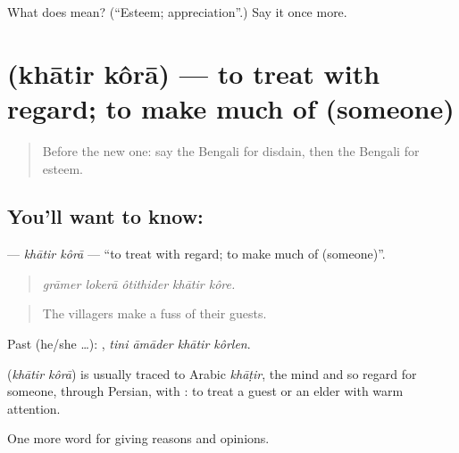 \begin{tcolorbox}[breakable,colback=teal!4,colframe=teal!35!black,title={Before you move on}]
What does  mean? (\textquotedblleft{}Esteem; appreciation\textquotedblright{}.) Say it once more.
\end{tcolorbox}
\section[\texorpdfstring{\bn{খাতির} \bn{করা} (khātir kôrā)}{খাতির করা (khātir kôrā)}]{  (khātir kôrā) — to treat with regard; to make much of (someone)}

\label{lesson:BN-C351-khatir-kora}



\begin{quote}
Before the new one: say the Bengali for disdain, then the Bengali for esteem.
\end{quote}

\subsection*{You'll want to know:  }
\textbf{ } — \emph{khātir kôrā} — \textquotedblleft{}to treat with regard; to make much of (someone)\textquotedblright{}.

\begin{quote}
    
\end{quote}

\begin{quote}
\emph{grāmer lokerā ôtithider khātir kôre.}
\end{quote}

\begin{quote}
The villagers make a fuss of their guests.
\end{quote}

Past (he/she …):    , \emph{tini āmāder khātir kôrlen}.

\begin{cousinweb}
\textbf{ } (\emph{khātir kôrā}) is usually traced to Arabic \emph{khāṭir}, the mind and so regard for someone, through Persian, with : to treat a guest or an elder with warm attention.
\end{cousinweb}

\begin{grammarlens}[title={What you've built}]
One more word for giving reasons and opinions.
\end{grammarlens}

